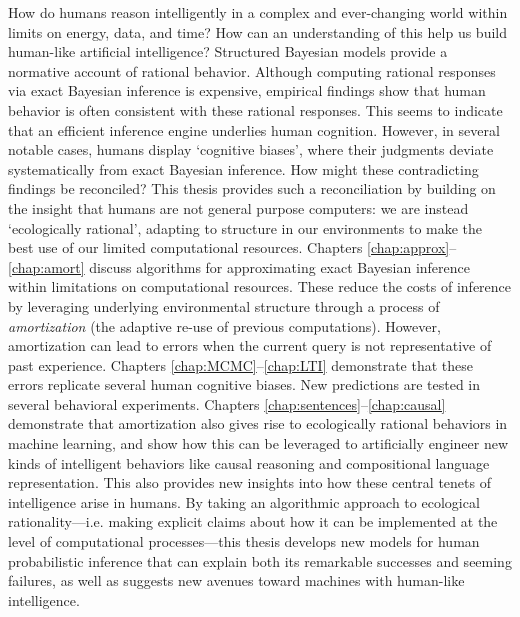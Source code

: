 

How do humans reason intelligently in a complex and ever-changing world within limits on energy, data, and time? How can an understanding of this help us build human-like artificial intelligence? Structured Bayesian models provide a normative account of rational behavior. Although computing rational responses via exact Bayesian inference is expensive, empirical findings show that human behavior is often consistent with these rational responses. This seems to indicate that an efficient inference engine underlies human cognition. However, in several notable cases, humans display `cognitive biases', where their judgments deviate systematically from exact Bayesian inference. How might these contradicting findings be reconciled? This thesis provides such a reconciliation by building on the insight that humans are not general purpose computers: we are instead `ecologically rational', adapting to structure in our environments to make the best use of our limited computational resources. Chapters \ref{chap:approx}--\ref{chap:amort} discuss algorithms for approximating exact Bayesian inference within limitations on computational resources. These reduce the costs of inference by leveraging underlying environmental structure through a process of \textit{amortization} (the adaptive re-use of previous computations). However, amortization can lead to errors when the current query is not representative of past experience. Chapters \ref{chap:MCMC}--\ref{chap:LTI} demonstrate that these errors replicate several human cognitive biases. New predictions are tested in several behavioral experiments. Chapters \ref{chap:sentences}--\ref{chap:causal} demonstrate that amortization also gives rise to ecologically rational behaviors in machine learning, and show how this can be leveraged to artificially engineer new kinds of intelligent behaviors like causal reasoning and compositional language representation. This also provides new insights into how these central tenets of intelligence arise in humans. By taking an algorithmic approach to ecological rationality---i.e. making explicit claims about how it can be implemented at the level of computational processes---this thesis develops new models for human probabilistic inference that can explain both its remarkable successes and seeming failures, as well as suggests new avenues toward machines with human-like intelligence.